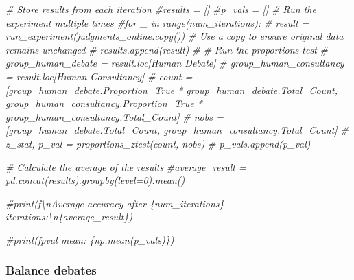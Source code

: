 \documentclass[
]{article}
\newenvironment{Shaded}{\begin{snugshade}}{\end{snugshade}}
\newcommand{\CommentTok}[1]{\textcolor[rgb]{0.56,0.35,0.01}{\textit{#1}}}
\begin{document}
\begin{Shaded}
\begin{Highlighting}[]
\CommentTok{\# Store results from each iteration}
\CommentTok{\#results = []}
\CommentTok{\#p\_vals = []}
\CommentTok{\# Run the experiment multiple times}
\CommentTok{\#for \_ in range(num\_iterations):}
\CommentTok{\#    result = run\_experiment(judgments\_online.copy())  \# Use a copy to ensure original data remains unchanged}
\CommentTok{\#    results.append(result)}
\CommentTok{\#    \# Run the proportions test}
\CommentTok{\#    group\_human\_debate = result.loc[\textquotesingle{}Human Debate\textquotesingle{}]}
\CommentTok{\#    group\_human\_consultancy = result.loc[\textquotesingle{}Human Consultancy\textquotesingle{}]}
\CommentTok{\#    count = [group\_human\_debate.Proportion\_True * group\_human\_debate.Total\_Count, group\_human\_consultancy.Proportion\_True * group\_human\_consultancy.Total\_Count]}
\CommentTok{\#    nobs = [group\_human\_debate.Total\_Count, group\_human\_consultancy.Total\_Count]}
\CommentTok{\#    z\_stat, p\_val = proportions\_ztest(count, nobs)}
\CommentTok{\#    p\_vals.append(p\_val)}

\CommentTok{\# Calculate the average of the results}
\CommentTok{\#average\_result = pd.concat(results).groupby(level=0).mean()}

\CommentTok{\#print(f\textquotesingle{}\textbackslash{}nAverage accuracy after \{num\_iterations\} iterations:\textbackslash{}n\{average\_result\}\textquotesingle{})}

\CommentTok{\#print(f\textquotesingle{}pval mean: \{np.mean(p\_vals)\}\textquotesingle{})}
\end{Highlighting}
\end{Shaded}

\subsubsection{Balance debates}\label{balance-debates}
\end{document}
